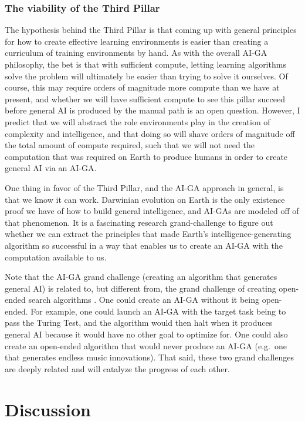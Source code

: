 \documentclass{article}
\begin{document}
\subsubsection{The viability of the Third Pillar}

The hypothesis behind the Third Pillar is that coming up with general principles for how to create effective learning environments is easier than creating a curriculum of training environments by hand. As with the overall AI-GA philosophy, the bet is that with sufficient compute, letting learning algorithms solve the problem will ultimately be easier than trying to solve it ourselves. Of course, this may require orders of magnitude more compute than we have at present, and whether we will have sufficient compute to see this pillar succeed before general AI is produced by the manual path is an open question. However, I predict that we will abstract the role environments play in the creation of complexity and intelligence, and that doing so will shave orders of magnitude off the total amount of compute required, such that we will not need the computation that was required on Earth to produce humans in order to create general AI via an AI-GA. 

One thing in favor of the Third Pillar, and the AI-GA approach in general, is that we know it can work. Darwinian evolution on Earth is the only existence proof we have of how to build general intelligence, and AI-GAs are modeled off of that phenomenon. It is a fascinating research grand-challenge to figure out whether we can extract the principles that made Earth's intelligence-generating algorithm so successful in a way that enables us to create an AI-GA with the computation available to us. 

Note that the AI-GA grand challenge (creating an algorithm that generates general AI) is related to, but different from, the grand challenge of creating open-ended search algorithms \cite{stanley:open}. One could create an AI-GA without it being open-ended. For example, one could launch an AI-GA with the target task being to pass the Turing Test, and the algorithm would then halt when it produces general AI because it would have no other goal to optimize for. One could also create an open-ended algorithm that would never produce an AI-GA (e.g.\ one that generates endless music innovations). That said, these two grand challenges are deeply related and will catalyze the progress of each other. 

\section{Discussion}
\label{discussion}
\end{document}
